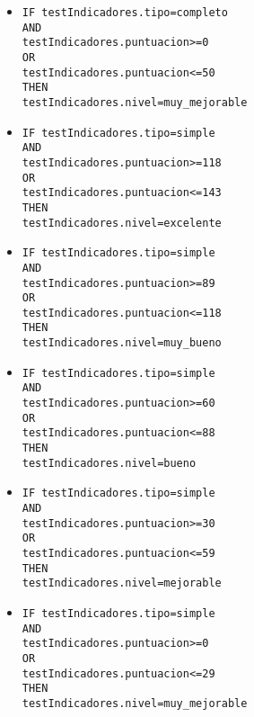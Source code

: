 \begin{enumerate}
\begin{enumerate}
\begin{itemize}
            \item \texttt{IF testIndicadores.tipo=completo \\AND\\ testIndicadores.puntuacion>=0 \\OR\\ testIndicadores.puntuacion<=50 \\THEN\\ testIndicadores.nivel=muy\_mejorable}
            \item \texttt{IF testIndicadores.tipo=simple \\AND\\ testIndicadores.puntuacion>=118 \\OR\\ testIndicadores.puntuacion<=143 \\THEN\\ testIndicadores.nivel=excelente}
            \item \texttt{IF testIndicadores.tipo=simple \\AND\\ testIndicadores.puntuacion>=89 \\OR\\ testIndicadores.puntuacion<=118 \\THEN\\ testIndicadores.nivel=muy\_bueno}
            \item \texttt{IF testIndicadores.tipo=simple \\AND\\ testIndicadores.puntuacion>=60 \\OR\\ testIndicadores.puntuacion<=88 \\THEN\\ testIndicadores.nivel=bueno}
            \item \texttt{IF testIndicadores.tipo=simple \\AND\\ testIndicadores.puntuacion>=30 \\OR\\ testIndicadores.puntuacion<=59 \\THEN\\ testIndicadores.nivel=mejorable}
            \item \texttt{IF testIndicadores.tipo=simple \\AND\\ testIndicadores.puntuacion>=0 \\OR\\ testIndicadores.puntuacion<=29 \\THEN\\ testIndicadores.nivel=muy\_mejorable}
        \end{itemize}
    \end{enumerate} 
    
\end{enumerate}

